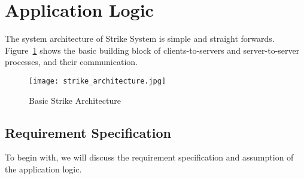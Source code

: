 \documentclass[dareport.tex]{subfiles}
\begin{document}
\section{Application Logic}
The system architecture of Strike System is simple and straight forwards. Figure~\ref{fig:strike_arch} shows the basic building block of clients-to-servers and server-to-server processes, and their communication.

\begin{figure}[h]
\caption{Basic Strike Architecture}
\label{fig:strike_arch}
\texttt{[image: strike\_architecture.jpg]}
\centering
\end{figure}

\subsection{Requirement Specification}
To begin with, we will discuss the requirement specification and assumption of the application logic. 
\end{document}
